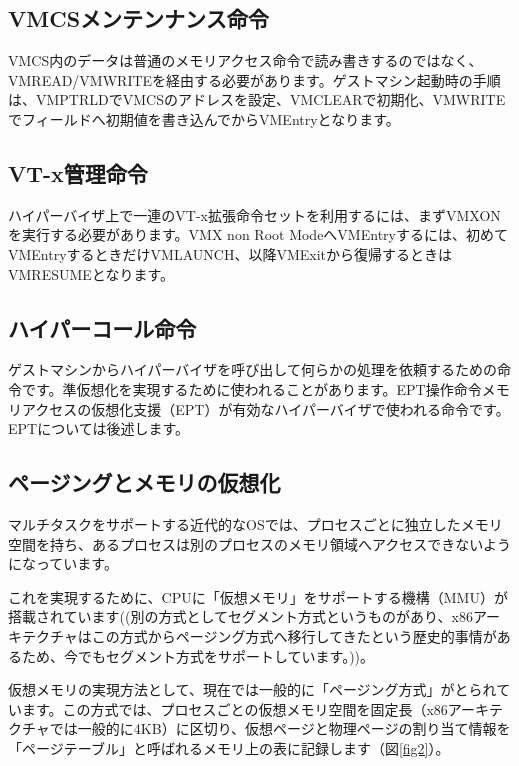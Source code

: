 \subsection*{VMCSメンテンナンス命令}
VMCS内のデータは普通のメモリアクセス命令で読み書きするのではなく、VMREAD/VMWRITEを経由する必要があります。ゲストマシン起動時の手順は、VMPTRLDでVMCSのアドレスを設定、VMCLEARで初期化、VMWRITEでフィールドへ初期値を書き込んでからVMEntryとなります。

\subsection*{VT-x管理命令}
ハイパーバイザ上で一連のVT-x拡張命令セットを利用するには、まずVMXONを実行する必要があります。VMX non Root ModeへVMEntryするには、初めてVMEntryするときだけVMLAUNCH、以降VMExitから復帰するときはVMRESUMEとなります。

\subsection*{ハイパーコール命令}
ゲストマシンからハイパーバイザを呼び出して何らかの処理を依頼するための命令です。準仮想化を実現するために使われることがあります。EPT操作命令メモリアクセスの仮想化支援（EPT）が有効なハイパーバイザで使われる命令です。EPTについては後述します。

\subsection*{ページングとメモリの仮想化}
マルチタスクをサポートする近代的なOSでは、プロセスごとに独立したメモリ空間を持ち、あるプロセスは別のプロセスのメモリ領域へアクセスできないようになっています。

これを実現するために、CPUに「仮想メモリ」をサポートする機構（MMU）が搭載されています((別の方式としてセグメント方式というものがあり、x86アーキテクチャはこの方式からページング方式へ移行してきたという歴史的事情があるため、今でもセグメント方式をサポートしています。))。

仮想メモリの実現方法として、現在では一般的に「ページング方式」がとられています。この方式では、プロセスごとの仮想メモリ空間を固定長（x86アーキテクチャでは一般的に4KB）に区切り、仮想ページと物理ページの割り当て情報を「ページテーブル」と呼ばれるメモリ上の表に記録します（図\ref{fig2}）。

